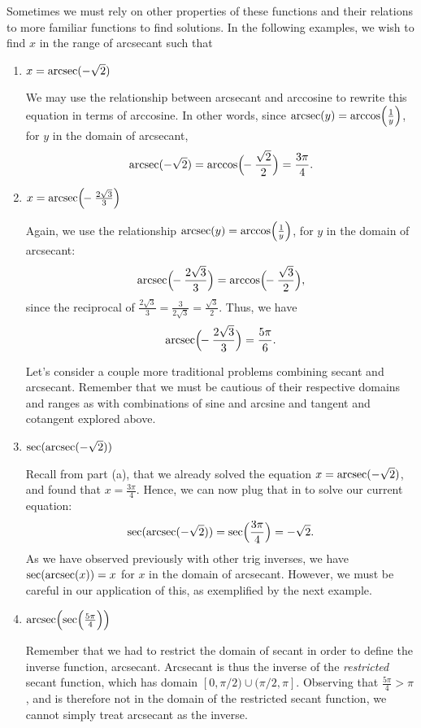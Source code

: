 \documentclass{ximera}
\begin{document}
\begin{example}
Sometimes we must rely on other properties of these functions and their relations to more familiar functions to find solutions. In the following examples, we wish to find $x$ in the range of arcsecant such that
\begin{enumerate}
\item $x = \operatorname{arcsec}(-\sqrt{2})$ \\
\begin{explanation}
We may use the relationship between arcsecant and arccosine to rewrite this equation in terms of arccosine. In other words, since $\operatorname{arcsec}(y) = \arccos\!\Big(\frac{1}{y}\Big)$, for $y$ in the domain of arcsecant,
$$\operatorname{arcsec}(-\sqrt{2}) = \arccos\!\Big(\!\!-\frac{\sqrt{2}}{2}\Big) = \frac{3\pi}{4}.$$
\end{explanation}

\item $x=\operatorname{arcsec} \!\Big(\!\! - \frac{2\sqrt{3}}{3}\Big)$\\
\begin{explanation}
Again, we use the relationship $\operatorname{arcsec}(y) = \arccos\!\Big(\frac{1}{y}\Big)$, for $y$ in the domain of arcsecant:
%
$$\operatorname{arcsec} \!\Big(\!\! - \frac{2\sqrt{3}}{3}\Big) = \arccos\!\Big(\!\! - \frac{\sqrt{3}}{2}\Big),$$
%
since the reciprocal of $\frac{2\sqrt{3}}{3} = \frac{3}{2\sqrt{3}} = \frac{\sqrt{3}}{2}$. Thus, we have 
%
$$\operatorname{arcsec} \!\Big(\!\! - \frac{2\sqrt{3}}{3}\Big)=\frac{5\pi}{6}.$$
\end{explanation}

Let's consider a couple more traditional problems combining secant and arcsecant. Remember that we must be cautious of their respective domains and ranges as with combinations of sine and arcsine and tangent and cotangent explored above.
\item $\sec(\operatorname{arcsec}(-\sqrt{2}))$\\
\begin{explanation}
Recall from part (a), that we already solved the equation $x = \operatorname{arcsec}(-\sqrt{2})$, and found that $x = \frac{3\pi}{4}$. Hence, we can now plug that in to solve our current equation:
%
$$\sec(\operatorname{arcsec}(-\sqrt{2})) = \sec\!\Big(\frac{3\pi}{4}\Big) = -\sqrt{2}.$$
%
As we have observed previously with other trig inverses, we have $\sec(\operatorname{arcsec}(x)) = x$ for $x$ in the domain of arcsecant. However, we must be careful in our application of this, as exemplified by the next example.
\end{explanation}

\item $\operatorname{arcsec}\!\Big(\!\sec\!\Big(\frac{5\pi}{4}\Big)\Big)$\\
\begin{explanation}
Remember that we had to restrict the domain of secant in order to define the inverse function, arcsecant. Arcsecant is thus the inverse of the {\it restricted} secant function, which has domain $[0, \pi/2)\cup (\pi/2,\pi]$. Observing that $\frac{5\pi}{4} >\pi$, and is therefore not in the domain of the restricted secant function, we cannot simply treat arcsecant as the inverse.


\end{explanation}
\end{enumerate}
\end{example}
\end{document}
